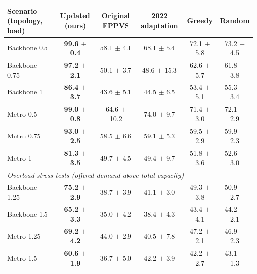 \begin{tabular}{lccccc}
\toprule
Scenario (topology, load) & Updated (ours) & Original FPPVS & 2022 adaptation & Greedy & Random \\
\midrule
Backbone 0.5 & \textbf{99.6 $\pm$ 0.4} & 58.1 $\pm$ 4.1 & 68.1 $\pm$ 5.4 & 72.1 $\pm$ 5.8 & 73.2 $\pm$ 4.5 \\
Backbone 0.75 & \textbf{97.2 $\pm$ 2.1} & 50.1 $\pm$ 3.7 & 48.6 $\pm$ 15.3 & 62.6 $\pm$ 5.7 & 61.8 $\pm$ 3.8 \\
Backbone 1 & \textbf{86.4 $\pm$ 3.7} & 43.6 $\pm$ 5.1 & 44.5 $\pm$ 6.5 & 53.4 $\pm$ 5.1 & 55.3 $\pm$ 3.4 \\
Metro 0.5 & \textbf{99.0 $\pm$ 0.8} & 64.6 $\pm$ 10.2 & 74.0 $\pm$ 9.7 & 71.4 $\pm$ 3.0 & 72.1 $\pm$ 2.9 \\
Metro 0.75 & \textbf{93.0 $\pm$ 2.5} & 58.5 $\pm$ 6.6 & 59.1 $\pm$ 5.3 & 59.5 $\pm$ 2.9 & 59.9 $\pm$ 2.3 \\
Metro 1 & \textbf{81.3 $\pm$ 3.5} & 49.7 $\pm$ 4.5 & 49.4 $\pm$ 9.7 & 51.8 $\pm$ 3.6 & 52.6 $\pm$ 3.0 \\
\midrule \multicolumn{6}{l}{\emph{Overload stress tests (offered demand above total capacity)}} \\
Backbone 1.25 & \textbf{75.2 $\pm$ 2.9} & 38.7 $\pm$ 3.9 & 41.1 $\pm$ 3.0 & 49.3 $\pm$ 3.8 & 50.9 $\pm$ 2.7 \\
Backbone 1.5 & \textbf{65.2 $\pm$ 3.3} & 35.0 $\pm$ 4.2 & 38.4 $\pm$ 4.3 & 43.4 $\pm$ 4.1 & 44.2 $\pm$ 2.1 \\
Metro 1.25 & \textbf{69.2 $\pm$ 4.2} & 44.0 $\pm$ 2.9 & 40.5 $\pm$ 7.8 & 47.2 $\pm$ 2.1 & 46.9 $\pm$ 2.3 \\
Metro 1.5 & \textbf{60.6 $\pm$ 1.9} & 36.7 $\pm$ 5.0 & 42.2 $\pm$ 3.9 & 42.2 $\pm$ 2.7 & 43.1 $\pm$ 1.3 \\
\bottomrule
\end{tabular}